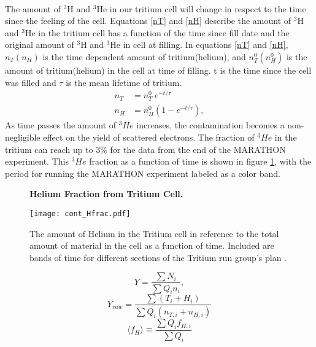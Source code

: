 \paragraph{}The amount of $^3$H and $^3$He in our tritium cell will change in respect to the time since the feeling of the cell. Equations \ref{nT} and \ref{nH} describe the amount of $^3$H and $^3$He in the tritium cell has a function of the time since fill date and the original amount of $^3$H and $^3$He in cell at filling. In equations \ref{nT} and \ref{nH}, $n_T(n_H)$ is the time dependent amount of tritium(helium), and  $n_T^0(n_H^0)$ is the amount of tritium(helium) in the cell at time of filling. t is the time since the cell was filled and $\tau$ is the mean lifetime of tritium.
\begin{align}
	n_T &= n_T^0 \: e^{-t/\tau} \label{nT}\\
	n_H &= n_H^0(1 - e^{-t/\tau}) \label{nH},
\end{align}
As time passes the amount of $^3He$ increases, the contamination becomes a non-negligible effect on the yield of scattered electrons. The fraction of $^3He$ in the tritium can reach up to 3$\%$ for the data from the end of the MARATHON experiment. This $^3He$ fraction as a function of time is shown in figure \ref{Hfract}, with the period for running the MARATHON experiment labeled as a color band. 

\begin{figure}[t]
	\centering
	\textbf{Helium Fraction from Tritium Cell. }\par\medskip
	\texttt{[image: cont\_Hfrac.pdf]}
	\caption{The amount of Helium in the Tritium cell in reference to the total amount of material in the cell as a function of time. Included are bands of time for different sections of the Tritium run group's plan \cite{Beta}.}
	\label{Hfract}
\end{figure}
\begin{equation}
Y = \frac{\sum N_i}{\sum Q_i n_i}, \label{yield} 
\end{equation}
\begin{equation}
Y_{raw} = \frac{\sum (T_i + H_i)}{\sum Q_i (n_{T,i} + n_{H,i})} \label{Yraw}
\end{equation}
\begin{equation}
\langle f_H \rangle \equiv \frac{\sum Q_i f_{H,i}}{\sum Q_i} \label{QwHf}
\end{equation}


